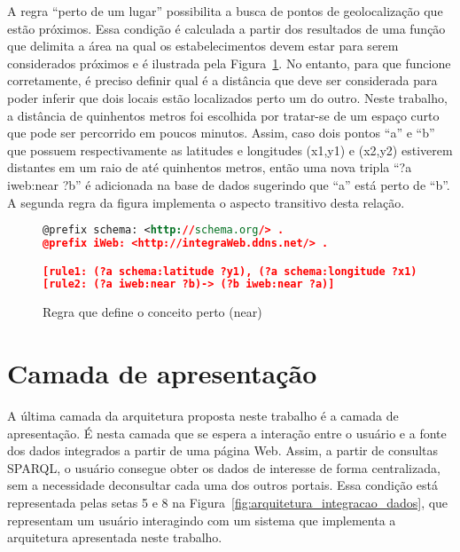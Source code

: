 A regra ``perto de um lugar'' possibilita a busca de pontos de geolocalização que estão próximos. Essa condição é calculada a partir dos resultados de uma função que delimita a área na qual os estabelecimentos devem estar para serem considerados próximos e é ilustrada pela Figura~\ref{fig:regra_rdf_near}. No entanto, para que funcione corretamente, é preciso definir qual é a distância que deve ser considerada para poder inferir que dois locais estão localizados perto um do outro.  Neste trabalho, a distância de quinhentos metros foi escolhida por tratar-se de um espaço curto que pode ser percorrido em poucos minutos. Assim, caso  dois pontos ``a'' e ``b'' que possuem respectivamente as latitudes e longitudes (x1,y1) e  (x2,y2) estiverem distantes  em um raio de até quinhentos metros, então uma nova tripla ``?a iweb:near ?b'' é adicionada na base de dados sugerindo que ``a'' está perto de ``b''. A segunda regra da figura implementa o aspecto transitivo desta relação.

\begin{figure}[!ht]
    \begin{lstlisting}[language=XML]
@prefix schema: <http://schema.org/> .
@prefix iWeb: <http://integraWeb.ddns.net/> .

[rule1: (?a schema:latitude ?y1), (?a schema:longitude ?x1), (?b schema:latitude ?y2), (?b schema:longitude ?x2), near(?x1, ?y1, ?x2, ?y2) -> (?a iweb:near ?b)]
[rule2: (?a iweb:near ?b)-> (?b iweb:near ?a)]
    \end{lstlisting}
    \caption{Regra que define o conceito perto (near)}
    \label{fig:regra_rdf_near} 
\end{figure}

\section{Camada de apresentação}
\label{sec:camada_de_apresentacao}

A última camada da arquitetura proposta neste trabalho é a camada de apresentação. É nesta camada que se espera a interação entre o usuário e a fonte dos dados integrados a partir de uma página Web. Assim, a partir de consultas SPARQL, o usuário consegue obter os dados de interesse de forma centralizada, sem a necessidade deconsultar cada uma dos outros portais. Essa condição está representada pelas setas 5 e 8 na Figura~\ref{fig:arquitetura_integracao_dados}, que representam um usuário interagindo com um sistema que implementa a arquitetura apresentada neste trabalho.

